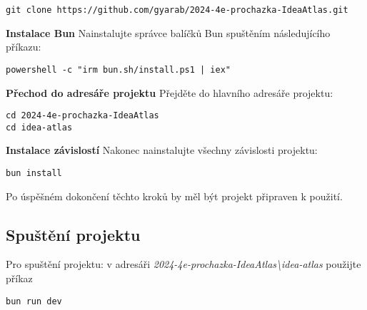 \begin{lstlisting}[style= bash]
git clone https://github.com/gyarab/2024-4e-prochazka-IdeaAtlas.git
\end{lstlisting}
\textbf{Instalace Bun}
\newline
Nainstalujte správce balíčků Bun spuštěním následujícího příkazu:

\begin{lstlisting}[style= bash]
powershell -c "irm bun.sh/install.ps1 | iex"
\end{lstlisting}

\textbf{Přechod do adresáře projektu}
\newline
Přejděte do hlavního adresáře projektu:

\begin{lstlisting}[style= bash]
cd 2024-4e-prochazka-IdeaAtlas
cd idea-atlas
\end{lstlisting}

\textbf{Instalace závislostí}
\newline
Nakonec nainstalujte všechny závislosti projektu:

\begin{lstlisting}[style= bash]
bun install
\end{lstlisting}

Po úspěšném dokončení těchto kroků by měl být projekt připraven k použití.


\subsection{Spuštění projektu}
Pro spuštění projektu: v adresáři \textit{2024-4e-prochazka-IdeaAtlas\textbackslash idea-atlas} použijte příkaz
\begin{lstlisting}[style= bash]
bun run dev
\end{lstlisting}